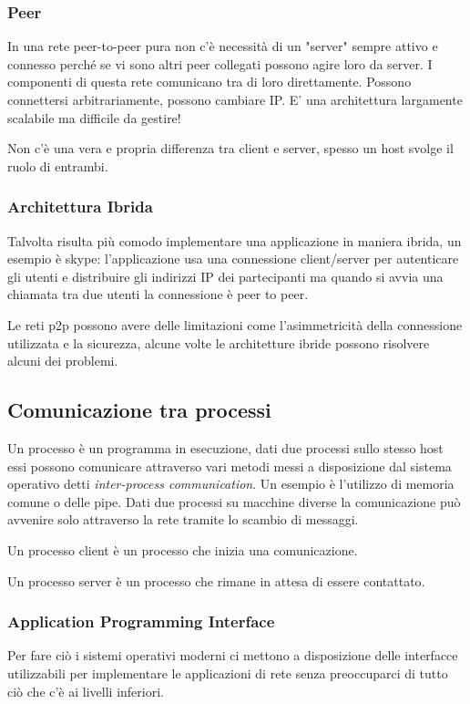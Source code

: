 \subsubsection{Peer}
In una rete peer-to-peer pura non c'è necessità di un "server" sempre attivo e connesso perché se vi sono altri peer collegati possono agire loro da server.
I componenti di questa rete comunicano tra di loro direttamente.
Possono connettersi arbitrariamente, possono cambiare IP.
E' una architettura largamente scalabile ma difficile da gestire!

Non c'è una vera e propria differenza tra client e server, spesso un host svolge il ruolo di entrambi.

\subsubsection{Architettura Ibrida}
Talvolta risulta più comodo implementare una applicazione in maniera ibrida, un esempio è skype: l'applicazione usa una connessione client/server per autenticare gli utenti e distribuire gli indirizzi IP dei partecipanti ma quando si avvia una chiamata tra due utenti la connessione è peer to peer.

Le reti p2p possono avere delle limitazioni come l'asimmetricità della connessione utilizzata e la sicurezza, alcune volte le architetture ibride possono risolvere alcuni dei problemi.

\subsection{Comunicazione tra processi}
Un processo è un programma in esecuzione, dati due processi sullo stesso host essi possono comunicare attraverso vari metodi messi a disposizione dal sistema operativo detti \emph{inter-process communication}. Un esempio è l'utilizzo di memoria comune o delle pipe.
Dati due processi su macchine diverse la comunicazione può avvenire solo attraverso la rete tramite lo scambio di messaggi.

Un processo client è un processo che inizia una comunicazione.

Un processo server è un processo che rimane in attesa di essere contattato.

\subsubsection{Application Programming Interface}
Per fare ciò i sistemi operativi moderni ci mettono a disposizione delle interfacce utilizzabili per implementare le applicazioni di rete senza preoccuparci di tutto ciò che c'è ai livelli inferiori.

